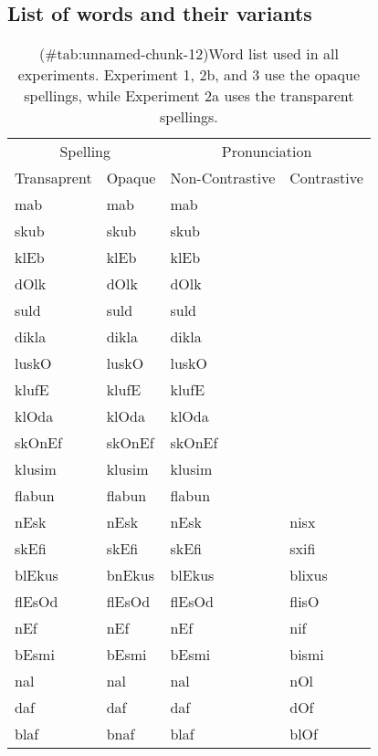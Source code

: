\clearpage



\begin{appendix}
\section{}
\subsection{List of words and their variants}\label{appendix-c}

\begin{table}[!h]

\caption{(\#tab:unnamed-chunk-12)Word list used in all experiments. Experiment 1, 2b, and 3 use the opaque spellings, while Experiment 2a uses the transparent spellings.}
\centering
\fontsize{8}{10}\selectfont
\begin{tabular}{llll}
\toprule
\multicolumn{2}{c}{Spelling} & \multicolumn{2}{c}{Pronunciation} \\
\cmidrule(l{3pt}r{3pt}){1-2} \cmidrule(l{3pt}r{3pt}){3-4}
Transaprent & Opaque & Non-Contrastive & Contrastive\\
\midrule
mab & mab & mab & \\
skub & skub & skub & \\
klEb & klEb & klEb & \\
dOlk & dOlk & dOlk & \\
suld & suld & suld & \\
dikla & dikla & dikla & \\
luskO & luskO & luskO & \\
klufE & klufE & klufE & \\
klOda & klOda & klOda & \\
skOnEf & skOnEf & skOnEf & \\
klusim & klusim & klusim & \\
flabun & flabun & flabun & \\
nEsk & nEsk & nEsk & nisx\\
skEfi & skEfi & skEfi & sxifi\\
blEkus & bnEkus & blEkus & blixus\\
flEsOd & flEsOd & flEsOd & flisO\\
nEf & nEf & nEf & nif\\
bEsmi & bEsmi & bEsmi & bismi\\
nal & nal & nal & nOl\\
daf & daf & daf & dOf\\
blaf & bnaf & blaf & blOf\\

\end{tabular}
\end{table}
\end{appendix}
